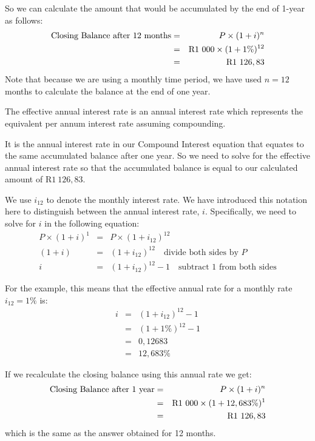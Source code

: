 
So we can calculate the amount that would be accumulated by the end of 1-year as follows:
\begin{eqnarray*}
\mbox{Closing Balance after 12 months}&=& P \times (1 + i)^n \\
&=& \rm{R}1~000 \times (1 + 1\%)^{12} \\
&=& \rm{R}1~126,83
\end{eqnarray*}
Note that because we are using a monthly time period, we have used $n=12$ months to calculate the balance at the end of one year.

The effective annual interest rate is an annual interest rate which represents the equivalent per annum interest rate assuming compounding.

It is the annual interest rate in our Compound Interest equation that equates to the same accumulated balance after one year. So we need to solve for the effective annual interest rate so that the accumulated balance is equal to our calculated amount of R$1~126,83$.

We use $i_{12}$ to denote the monthly interest rate. We have introduced this notation here to distinguish between the annual interest rate, $i$. Specifically, we need to solve for $i$ in the following equation:
\begin{eqnarray*}
P\times (1 + i) ^1 &=& P\times (1 + i_{12})^{12}\\
(1 + i) &=& (1 + i_{12})^{12}\quad\mbox{divide both sides by $P$}\\
i &=& (1 + i_{12})^{12}-1\quad\mbox{subtract $1$ from both sides}
\end{eqnarray*}

For the example, this means that the effective annual rate for a monthly rate $i_{12}=1\%$ is:
\begin{eqnarray*}
i &=& (1 + i_{12})^{12}-1\\
&=& (1 + 1\%)^{12}-1\\
&=&0,12683\\
&=&12,683\%
\end{eqnarray*}

If we recalculate the closing balance using this annual rate we get:
\begin{eqnarray*}
\mbox{Closing Balance after 1 year}&=& P \times (1 + i)^n \\
&=& \rm{R}1~000 \times (1 + 12,683\%)^{1} \\
&=& \rm{R}1~126,83
\end{eqnarray*}
which is the same as the answer obtained for 12 months.

